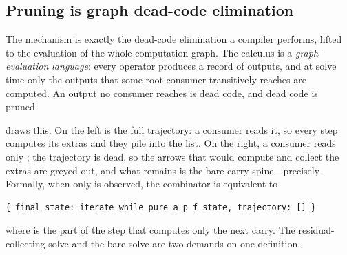 \subsection{Pruning is graph dead-code elimination}

The mechanism is exactly the dead-code elimination a compiler performs, lifted to
the evaluation of the whole computation graph. The calculus is a
\emph{graph-evaluation language}: every operator produces a record of outputs, and
at solve time only the outputs that some root consumer transitively reaches are
computed. An output no consumer reaches is dead code, and dead code is pruned.

 draws this. On the left is the full trajectory: a consumer
reads it, so every step computes its extras and they pile into the list. On the
right, a consumer reads only ; the trajectory is dead, so the
arrows that would compute and collect the extras are greyed out, and what remains
is the bare carry spine---precisely . Formally, when
only  is observed, the combinator is equivalent to
\begin{lstlisting}[style=l4style]
{ final_state: iterate_while_pure a p f_state, trajectory: [] }
\end{lstlisting}
where  is the part of the step that computes only the next carry.
The residual-collecting solve and the bare solve are two demands on one
definition.


